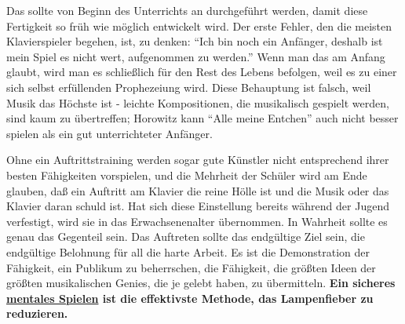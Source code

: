 Das sollte von Beginn des Unterrichts an durchgeführt werden, damit diese Fertigkeit so früh wie möglich entwickelt wird.
Der erste Fehler, den die meisten Klavierspieler begehen, ist, zu denken: \enquote{Ich bin noch ein Anfänger, deshalb ist mein Spiel es nicht wert, aufgenommen zu werden.}
Wenn man das am Anfang glaubt, wird man es schließlich für den Rest des Lebens befolgen, weil es zu einer sich selbst erfüllenden Prophezeiung wird.
Diese Behauptung ist falsch, weil Musik das Höchste ist - leichte Kompositionen, die musikalisch gespielt werden, sind kaum zu übertreffen; Horowitz kann \enquote{Alle meine Entchen} auch nicht besser spielen als ein gut unterrichteter Anfänger.

Ohne ein Auftrittstraining werden sogar gute Künstler nicht entsprechend ihrer besten Fähigkeiten vorspielen, und die Mehrheit der Schüler wird am Ende glauben, daß ein Auftritt am Klavier die reine Hölle ist und die Musik oder das Klavier daran schuld ist.
Hat sich diese Einstellung bereits während der Jugend verfestigt, wird sie in das Erwachsenenalter übernommen.
In Wahrheit sollte es genau das Gegenteil sein.
Das Auftreten sollte das endgültige Ziel sein, die endgültige Belohnung für all die harte Arbeit.
Es ist die Demonstration der Fähigkeit, ein Publikum zu beherrschen, die Fähigkeit, die größten Ideen der größten musikalischen Genies, die je gelebt haben, zu übermitteln.
\textbf{Ein sicheres \hyperlink{c1ii12mental}{mentales Spielen} ist die effektivste Methode, das Lampenfieber zu reduzieren.}

